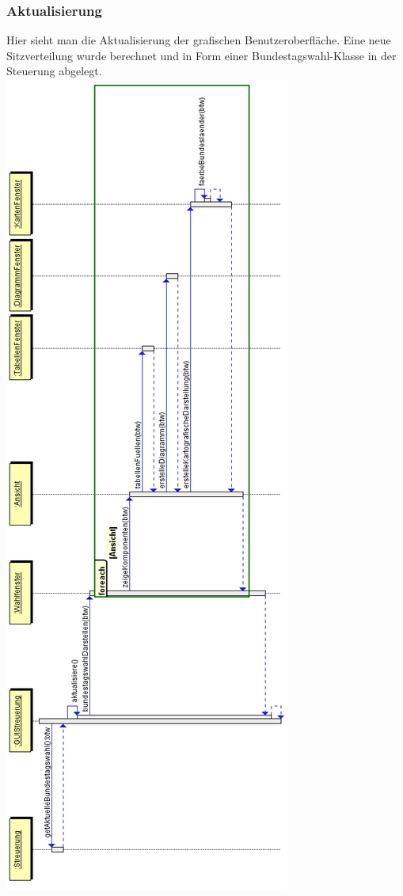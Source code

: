 \documentclass[12pt,a4paper,titlepage]{article}
\begin{document}
\subsubsection{Aktualisierung}
Hier sieht man die Aktualisierung der grafischen Benutzeroberfläche. Eine neue Sitzverteilung wurde berechnet und in Form einer Bundestagswahl-Klasse in der Steuerung abgelegt. \\
\includegraphics[scale=0.5]{GUI_Aktualisierung}
\end{document}
